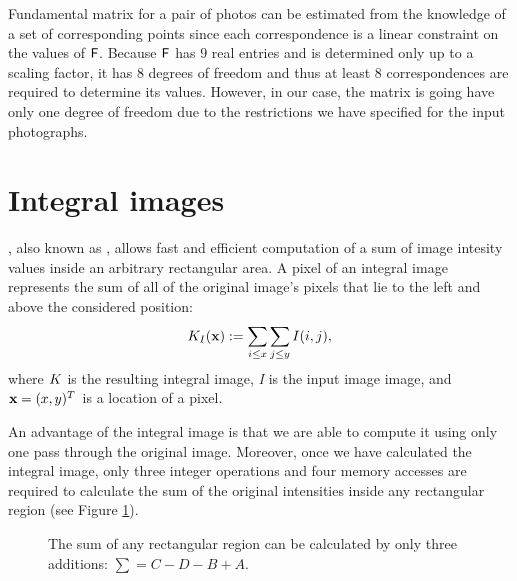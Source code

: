 Fundamental matrix for a pair of photos can be estimated from the knowledge of a set of corresponding points since each correspondence is a linear constraint on the values of $\mathsf{F}$. 
Because $\mathsf{F}$ has $9$ real entries and is determined only up to a scaling factor, it has $8$ degrees of freedom and thus at least $8$ correspondences are required to determine its values. 
However, in our case, the matrix is going have only one degree of freedom due to the restrictions we have specified for the input photographs. 

\section{Integral images}

, also known as , allows fast and efficient computation of a sum of image intesity values inside an arbitrary rectangular area.
A pixel of an integral image represents the sum of all of the original image's pixels that lie to the left and above the considered position: 
\begin{equation*}
K_I(\mathbf{x}) := \sum_{i \le x} \sum_{j \le y} I(i,j),
\end{equation*}
where $K$ is the resulting integral image, \emph{I} is the input image image, and $\mathbf{x} = (x, y)^{T}$ is a location of a pixel.

An advantage of the integral image is that we are able to compute it using only one pass through the original image. 
Moreover, once we have calculated the integral image, only three integer operations and four memory accesses are required to calculate the sum 
of the original intensities inside any rectangular region (see Figure \ref{fig:integral}).

\begin{figure}[h]
  \label{fig:integral}
  \caption{The sum of any rectangular region can be calculated by only three additions: $\sum = C - D - B + A$.}
 \end{figure}




